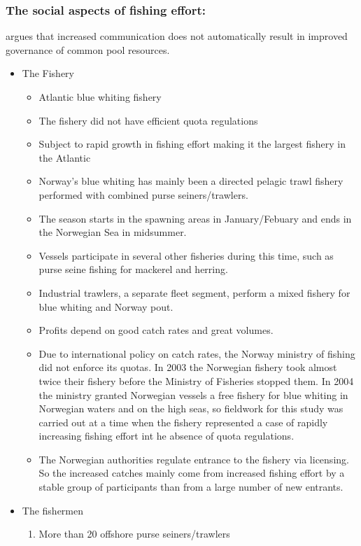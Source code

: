 \documentclass[a4paper,10pt]{article}
\begin{document}
\subsubsection*{The social aspects of fishing effort: \cite{Gezelius:2007}}
\cite{Gezelius:2007} argues that increased communication does not automatically result in improved governance of common pool resources. 
\begin{itemize}
\item The Fishery
	\begin{itemize}
	\item Atlantic blue whiting fishery
	\item The fishery did not have efficient quota regulations
	\item Subject to rapid growth in fishing effort making it the largest fishery in the Atlantic
	\item Norway's blue whiting has mainly been a directed pelagic trawl fishery performed with combined purse seiners/trawlers. 
	\item The season starts in the spawning areas in January/Febuary and ends in the Norwegian Sea in midsummer. 
	\item Vessels participate in several other fisheries during this time, such as purse seine fishing for mackerel and herring. 
	\item Industrial trawlers, a separate fleet segment, perform a mixed fishery  for blue whiting and Norway pout. 
	\item Profits depend on good catch rates and great volumes.
	\item Due to international policy on catch rates, the Norway ministry of fishing did not enforce its quotas. In 2003 the Norwegian fishery took almost twice their fishery before the Ministry of Fisheries stopped them. In 2004 the ministry granted Norwegian vessels a free fishery for blue whiting in Norwegian waters and on the high seas, so fieldwork for this study was carried out at a time when the fishery represented a case of rapidly increasing fishing effort int he absence of quota regulations. 
	\item The Norwegian authorities regulate entrance to the fishery via licensing. So the increased catches mainly come from increased fishing effort by a stable group of participants than from a large number of new entrants. 
	\end{itemize}
\item The fishermen
\begin{enumerate}
	\item More than 20 offshore purse seiners/trawlers

\end{enumerate}
\end{itemize}
\end{document}
